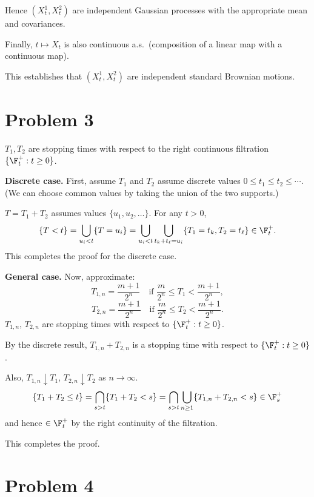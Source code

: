 Hence $(X_t^1, X_t^2)$ are independent Gaussian processes with the appropriate mean and covariances.

Finally, $t \mapsto X_t$ is also continuous a.s.\ (composition of a linear map with a continuous map).

This establishes that $(X_t^1, X_t^2)$ are independent standard Brownian motions.

\section*{Problem 3}

$T_1, T_2$ are stopping times with respect to the right continuous filtration $\{\F_t^+ : t \geq 0\}$.

\textbf{Discrete case.} First, assume $T_1$ and $T_2$ assume discrete values $0 \leq t_1 \leq t_2 \leq \cdots$. (We can choose common values by taking the union of the two supports.)

$T = T_1 + T_2$ assumes values $\{u_1, u_2, \ldots\}$. For any $t > 0$,
\[
    \{T < t\} = \bigcup_{u_i < t} \{T = u_i\} = \bigcup_{u_i < t} \bigcup_{\substack{t_k + t_\ell = u_i}} \{T_1 = t_k, T_2 = t_\ell\} \in \F_t^+.
\]
This completes the proof for the discrete case.

\textbf{General case.} Now, approximate:
\[
    T_{1,n} = \frac{m+1}{2^n} \quad \text{if } \frac{m}{2^n} \leq T_1 < \frac{m+1}{2^n},
\]
\[
    T_{2,n} = \frac{m+1}{2^n} \quad \text{if } \frac{m}{2^n} \leq T_2 < \frac{m+1}{2^n}.
\]
$T_{1,n}$, $T_{2,n}$ are stopping times with respect to $\{\F_t^+ : t \geq 0\}$.

By the discrete result, $T_{1,n} + T_{2,n}$ is a stopping time with respect to $\{\F_t^+ : t \geq 0\}$.

Also, $T_{1,n} \downarrow T_1$, $T_{2,n} \downarrow T_2$ as $n \to \infty$.
\[
    \{T_1 + T_2 \leq t\} = \bigcap_{s > t} \{T_1 + T_2 < s\} = \bigcap_{s > t} \bigcup_{n \geq 1} \{T_{1,n} + T_{2,n} < s\} \in \F_s^+
\]
and hence $\in \F_t^+$ by the right continuity of the filtration.

This completes the proof.

\section*{Problem 4}

